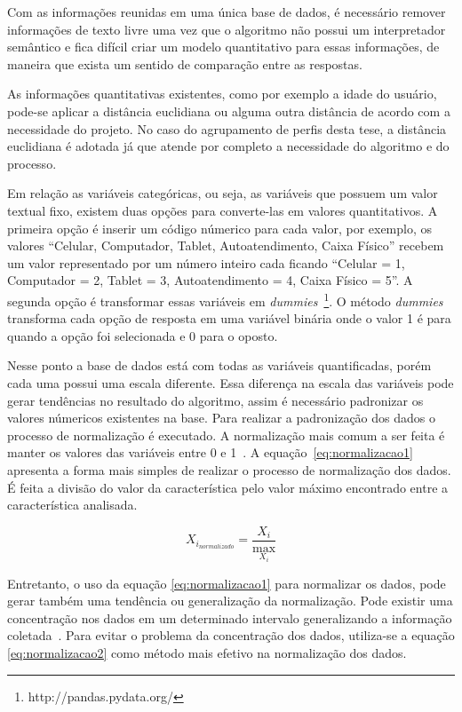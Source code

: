 Com as informações reunidas em uma única base de dados, é necessário remover informações de texto livre uma vez que o algoritmo não possui um interpretador semântico e fica difícil criar um modelo quantitativo para essas informações, de maneira que exista um sentido de comparação entre as respostas.

As informações quantitativas existentes, como por exemplo a idade do usuário, pode-se aplicar a distância euclidiana ou alguma outra distância de acordo com a necessidade do projeto. No caso do agrupamento de perfis desta tese, a distância euclidiana é adotada já que atende por completo a necessidade do algoritmo e do processo.

Em relação as variáveis categóricas, ou seja, as variáveis que possuem um valor textual fixo, existem duas opções para converte-las em valores quantitativos. A primeira opção é inserir um código númerico para cada valor, por exemplo, os valores ``Celular, Computador, Tablet, Autoatendimento, Caixa Físico'' recebem um valor representado por um número inteiro cada ficando ``Celular = 1, Computador = 2, Tablet = 3, Autoatendimento = 4, Caixa Físico = 5''. A segunda opção é transformar essas variáveis em \emph{dummies}~\footnote{http://pandas.pydata.org/}. O método \emph{dummies} transforma cada opção de resposta em uma variável binária onde o valor 1 é para quando a opção foi selecionada e 0 para o oposto.

Nesse ponto a base de dados está com todas as variáveis quantificadas, porém cada uma possui uma escala diferente. Essa diferença na escala das variáveis pode gerar tendências no resultado do algoritmo, assim é necessário padronizar os valores númericos existentes na base. Para realizar a padronização dos dados o processo de normalização é executado. A normalização mais comum a ser feita é manter os valores das variáveis entre 0 e 1~\cite{lattin:2011}. A equação~\ref{eq:normalizacao1} apresenta a forma mais simples de realizar o processo de normalização dos dados. É feita a divisão do valor da característica pelo valor máximo encontrado entre a característica analisada.

\begin{equation}
	X_{i_{normalizado}} = \frac{X_i}{\max_{X_i}}
	\label{eq:normalizacao1}
\end{equation}

Entretanto, o uso da equação \ref{eq:normalizacao1} para normalizar os dados, pode gerar também uma tendência ou generalização da normalização. Pode existir uma concentração nos dados em um determinado intervalo generalizando a informação coletada~\cite{masiero:2013}. Para evitar o problema da concentração dos dados, utiliza-se a equação \ref{eq:normalizacao2} como método mais efetivo na normalização dos dados.


